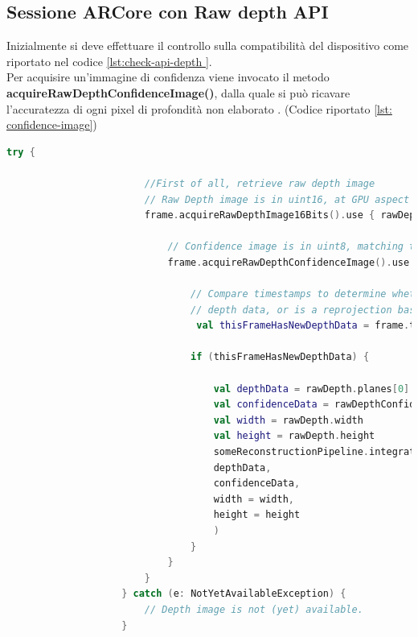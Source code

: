 \documentclass[crop=false, class=book]{standalone}
\begin{document}
		\subsection{Sessione ARCore con Raw depth API}
		
		Inizialmente si deve effettuare il controllo sulla compatibilità del dispositivo come riportato nel codice \vref{lst:check-api-depth }.\\
		Per acquisire un'immagine di confidenza viene invocato il metodo \textbf{acquireRawDepthConfidenceImage()}, dalla quale si può ricavare l'accuratezza di ogni pixel di profondità non elaborato \cite{google2022rawdepth}. (Codice 				riportato \vref{lst: confidence-image})
		
		\begin{center}
				\begin{minipage}{0.95\textwidth}
					\begin{lstlisting}[caption={Estrazione di un'immagine di confidenza}, label={lst: confidence-image}, language=Kotlin]
					 try {
					 
					 	//First of all, retrieve raw depth image
  						// Raw Depth image is in uint16, at GPU aspect ratio, in native orientation.
  						frame.acquireRawDepthImage16Bits().use { rawDepth ->
  						
    						// Confidence image is in uint8, matching the depth image size.
    						frame.acquireRawDepthConfidenceImage().use { rawDepthConfidence ->
    						
      							// Compare timestamps to determine whether depth is is based on new
      							// depth data, or is a reprojection based on device movement.
     							 val thisFrameHasNewDepthData = frame.timestamp == rawDepth.timestamp
     							 
      							if (thisFrameHasNewDepthData) {
      							
        							val depthData = rawDepth.planes[0].buffer
        							val confidenceData = rawDepthConfidence.planes[0].buffer
        							val width = rawDepth.width
        							val height = rawDepth.height
        							someReconstructionPipeline.integrateNewImage(
          							depthData,
          							confidenceData,
         						 	width = width,
          							height = height
        							)
      							}
    						}
  						}
					} catch (e: NotYetAvailableException) {
  						// Depth image is not (yet) available.
					}
					
				\end{lstlisting}
			\end{minipage}
		\end{center}
		
\end{document}
